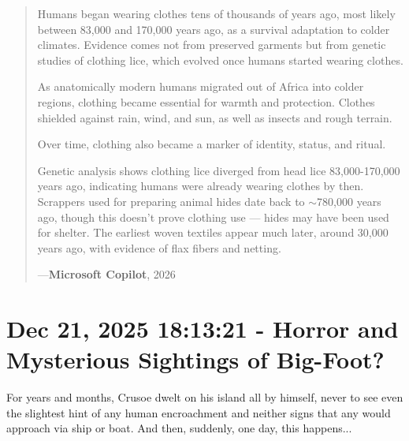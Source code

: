 \documentclass[a4paper]{article}
\begin{document}
\noindent
\begin{minipage}{1\textwidth}
\vspace{1em}
\begin{quotation}
{\ttfamily

Humans began wearing clothes tens of thousands of years ago, most likely between 83,000 and 170,000 years ago, as a survival adaptation to colder climates. Evidence comes not from preserved garments but from genetic studies of clothing lice, which evolved once humans started wearing clothes.

As anatomically modern humans migrated out of Africa into colder regions, clothing became essential for warmth and protection. Clothes shielded against rain, wind, and sun, as well as insects and rough terrain.

Over time, clothing also became a marker of identity, status, and ritual.

Genetic analysis shows clothing lice diverged from head lice 83,000-170,000 years ago, indicating humans were already wearing clothes by then. Scrappers used for preparing animal hides date back to $\sim$780,000 years ago, though this doesn't prove clothing use --- hides may have been used for shelter. The earliest woven textiles appear much later, around 30,000 years ago, with evidence of flax fibers and netting.

}
\hspace*{\fill} ---\textbf{Microsoft Copilot}, 2026\cite{copilot_assistant}
\end{quotation}
\vspace{1em}
\end{minipage}






\section{Dec 21, 2025 18:13:21 - Horror and Mysterious Sightings of Big-Foot?}
\label{SEC40}

For years and months, Crusoe dwelt on his island all by himself, never to see even the slightest hint of any human encroachment and neither signs that any would approach via ship or boat. And then, suddenly, one day, this happens...
\end{document}

